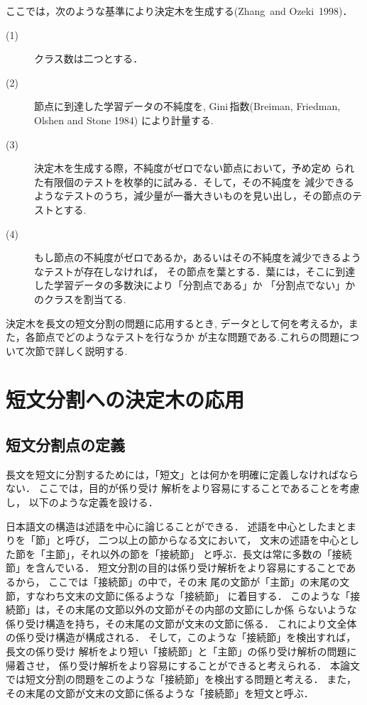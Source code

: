 ここでは，次のような基準により決定木を生成する(Zhang\ and Ozeki\ 1998)．
\begin{description}
\item[(1)]クラス数は二つとする．
\item[(2)]節点に到達した学習データの不純度を,
 Gini\,指数(Breiman, Friedman, Olshen and Stone 1984) により計量する.
\item[(3)]決定木を生成する際，不純度がゼロでない節点において，予め定め
られた有限個のテストを枚挙的に試みる．そして，その不純度を
減少できるようなテストのうち，減少量が一番大きいものを見い出し，その節点のテストとする.
\item[(4)]もし節点の不純度がゼロであるか，あるいはその不純度を減少できるようなテストが存在しなければ，
その節点を葉とする．葉には，そこに到達した学習データの多数決により「分割点である」か
「分割点でない」かのクラスを割当てる.
\end{description}
決定木を長文の短文分割の問題に応用するとき,
データとして何を考えるか，また，各節点でどのようなテストを行なうか
が主な問題である.これらの問題について次節で詳しく説明する.

\section{短文分割への決定木の応用}
\subsection{短文分割点の定義}
長文を短文に分割するためには，「短文」とは何かを明確に定義しなければならない．
ここでは，目的が係り受け
解析をより容易にすることであることを考慮し，
以下のような定義を設ける．

日本語文の構造は述語を中心に論じることができる．
述語を中心としたまとまりを「節」と呼び，
二つ以上の節からなる文において，
文末の述語を中心とした節を「主節」，それ以外の節を「接続節」
と呼ぶ．長文は常に多数の「接続節」を含んでいる．
短文分割の目的は係り受け解析をより容易にすることであるから，
ここでは「接続節」の中で，その末
尾の文節が「主節」の末尾の文節，すなわち文末の文節に係るような「接続節」
に着目する．
このような「接続節」は，その末尾の文節以外の文節がその内部の文節にしか係
らないような係り受け構造を持ち，その末尾の文節が文末の文節に係る．
これにより文全体の係り受け構造が構成される．
そして，このような「接続節」を検出すれば，長文の係り受け
解析をより短い「接続節」と「主節」の係り受け解析の問題に帰着させ，
係り受け解析をより容易にすることができると考えられる．
本論文では短文分割の問題をこのような「接続節」を検出する問題と考える．
また，その末尾の文節が文末の文節に係るような「接続節」を短文と呼ぶ．


